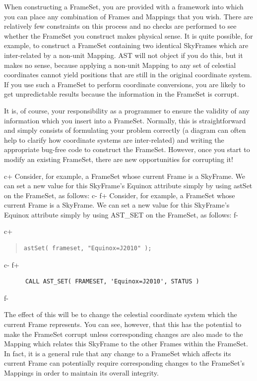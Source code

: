 \documentclass[twoside,11pt]{article}
\begin{document}
When constructing a FrameSet, you are provided with a framework into
which you can place any combination of Frames and Mappings that you
wish. There are relatively few constraints on this process and no
checks are performed to see whether the FrameSet you construct makes
physical sense.  It is quite possible, for example, to construct a
FrameSet containing two identical SkyFrames which are inter-related by
a non-unit Mapping. AST will not object if you do this, but it makes
no sense, because applying a non-unit Mapping to any set of celestial
coordinates cannot yield positions that are still in the original
coordinate system.  If you use such a FrameSet to perform coordinate
conversions, you are likely to get unpredictable results because the
information in the FrameSet is corrupt.

It is, of course, your responsibility as a programmer to ensure the
validity of any information which you insert into a
FrameSet. Normally, this is straightforward and simply consists of
formulating your problem correctly (a diagram can often help to
clarify how coordinate systems are inter-related) and writing the
appropriate bug-free code to construct the FrameSet. However, once you
start to modify an existing FrameSet, there are new opportunities for
corrupting it!

c+
Consider, for example, a FrameSet whose current Frame is a
SkyFrame. We can set a new value for this SkyFrame's Equinox attribute
simply by using astSet on the FrameSet, as follows:
c-
f+
Consider, for example, a FrameSet whose current Frame is a
SkyFrame. We can set a new value for this SkyFrame's Equinox attribute
simply by using AST\_SET on the FrameSet, as follows:
f-

c+
\begin{quote}
\small
\begin{verbatim}
astSet( frameset, "Equinox=J2010" );
\end{verbatim}
\normalsize
\end{quote}
c-
f+
\small
\begin{verbatim}
      CALL AST_SET( FRAMESET, 'Equinox=J2010', STATUS )
\end{verbatim}
\normalsize
f-

The effect of this will be to change the celestial coordinate system
which the current Frame represents. You can see, however, that this
has the potential to make the FrameSet corrupt unless corresponding
changes are also made to the Mapping which relates this SkyFrame to
the other Frames within the FrameSet. In fact, it is a general rule
that any change to a FrameSet which affects its current Frame can
potentially require corresponding changes to the FrameSet's Mappings
in order to maintain its overall integrity.
\end{document}
